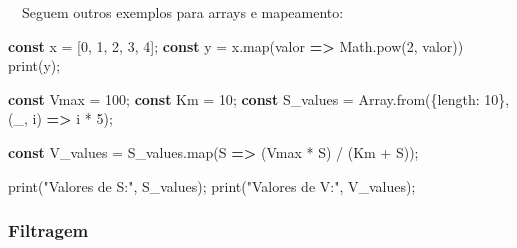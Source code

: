 \documentclass[
  portuguese,
  letterpaper,
  DIV=11,
  numbers=noendperiod]{scrreprt}
\newenvironment{Shaded}{\begin{snugshade}}{\end{snugshade}}
\newcommand{\BuiltInTok}[1]{\textcolor[rgb]{0.00,0.23,0.31}{#1}}
\newcommand{\DataTypeTok}[1]{\textcolor[rgb]{0.68,0.00,0.00}{#1}}
\newcommand{\DecValTok}[1]{\textcolor[rgb]{0.68,0.00,0.00}{#1}}
\newcommand{\FunctionTok}[1]{\textcolor[rgb]{0.28,0.35,0.67}{#1}}
\newcommand{\KeywordTok}[1]{\textcolor[rgb]{0.00,0.23,0.31}{\textbf{#1}}}
\newcommand{\NormalTok}[1]{\textcolor[rgb]{0.00,0.23,0.31}{#1}}
\newcommand{\OperatorTok}[1]{\textcolor[rgb]{0.37,0.37,0.37}{#1}}
\newcommand{\StringTok}[1]{\textcolor[rgb]{0.13,0.47,0.30}{#1}}
\begin{document}
\hfill\break

~~Seguem outros exemplos para arrays e mapeamento:

\hfill\break

\begin{Shaded}
\begin{Highlighting}[]
 \KeywordTok{const}\NormalTok{ x }\OperatorTok{=}\NormalTok{ [}\DecValTok{0}\OperatorTok{,} \DecValTok{1}\OperatorTok{,} \DecValTok{2}\OperatorTok{,} \DecValTok{3}\OperatorTok{,} \DecValTok{4}\NormalTok{]}\OperatorTok{;}
 \KeywordTok{const}\NormalTok{ y }\OperatorTok{=}\NormalTok{ x}\OperatorTok{.}\FunctionTok{map}\NormalTok{(valor }\KeywordTok{=\textgreater{}} \BuiltInTok{Math}\OperatorTok{.}\FunctionTok{pow}\NormalTok{(}\DecValTok{2}\OperatorTok{,}\NormalTok{ valor))}
 \FunctionTok{print}\NormalTok{(y)}\OperatorTok{;}
\end{Highlighting}
\end{Shaded}

\begin{Shaded}
\begin{Highlighting}[]
\KeywordTok{const}\NormalTok{ Vmax }\OperatorTok{=} \DecValTok{100}\OperatorTok{;}
\KeywordTok{const}\NormalTok{ Km }\OperatorTok{=} \DecValTok{10}\OperatorTok{;}
\KeywordTok{const}\NormalTok{ S\_values }\OperatorTok{=} \BuiltInTok{Array}\OperatorTok{.}\FunctionTok{from}\NormalTok{(\{}\DataTypeTok{length}\OperatorTok{:} \DecValTok{10}\NormalTok{\}}\OperatorTok{,}\NormalTok{ (\_}\OperatorTok{,}\NormalTok{ i) }\KeywordTok{=\textgreater{}}\NormalTok{ i }\OperatorTok{*} \DecValTok{5}\NormalTok{)}\OperatorTok{;}

\KeywordTok{const}\NormalTok{ V\_values }\OperatorTok{=}\NormalTok{ S\_values}\OperatorTok{.}\FunctionTok{map}\NormalTok{(S }\KeywordTok{=\textgreater{}}\NormalTok{ (Vmax }\OperatorTok{*}\NormalTok{ S) }\OperatorTok{/}\NormalTok{ (Km }\OperatorTok{+}\NormalTok{ S))}\OperatorTok{;}

\FunctionTok{print}\NormalTok{(}\StringTok{"Valores de S:"}\OperatorTok{,}\NormalTok{ S\_values)}\OperatorTok{;}
\FunctionTok{print}\NormalTok{(}\StringTok{"Valores de V:"}\OperatorTok{,}\NormalTok{ V\_values)}\OperatorTok{;}
\end{Highlighting}
\end{Shaded}

\hfill\break

\subsubsection*{Filtragem}\label{filtragem}
\end{document}
